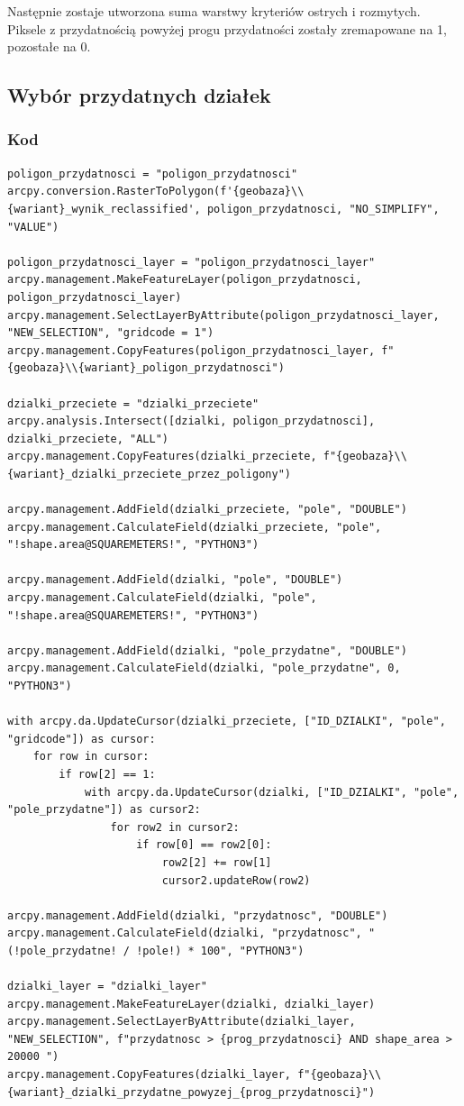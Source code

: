 \documentclass{article}
\begin{document}
Następnie zostaje utworzona suma warstwy kryteriów ostrych i rozmytych. Piksele z przydatnością powyżej progu przydatności zostały zremapowane na 1, pozostałe na 0.

\subsection{Wybór przydatnych działek}
\subsubsection{Kod}
\begin{lstlisting}
poligon_przydatnosci = "poligon_przydatnosci"
arcpy.conversion.RasterToPolygon(f'{geobaza}\\{wariant}_wynik_reclassified', poligon_przydatnosci, "NO_SIMPLIFY", "VALUE")

poligon_przydatnosci_layer = "poligon_przydatnosci_layer"
arcpy.management.MakeFeatureLayer(poligon_przydatnosci, poligon_przydatnosci_layer)
arcpy.management.SelectLayerByAttribute(poligon_przydatnosci_layer, "NEW_SELECTION", "gridcode = 1")
arcpy.management.CopyFeatures(poligon_przydatnosci_layer, f"{geobaza}\\{wariant}_poligon_przydatnosci")

dzialki_przeciete = "dzialki_przeciete"
arcpy.analysis.Intersect([dzialki, poligon_przydatnosci], dzialki_przeciete, "ALL")
arcpy.management.CopyFeatures(dzialki_przeciete, f"{geobaza}\\{wariant}_dzialki_przeciete_przez_poligony")

arcpy.management.AddField(dzialki_przeciete, "pole", "DOUBLE")
arcpy.management.CalculateField(dzialki_przeciete, "pole", "!shape.area@SQUAREMETERS!", "PYTHON3")

arcpy.management.AddField(dzialki, "pole", "DOUBLE")
arcpy.management.CalculateField(dzialki, "pole", "!shape.area@SQUAREMETERS!", "PYTHON3")

arcpy.management.AddField(dzialki, "pole_przydatne", "DOUBLE")
arcpy.management.CalculateField(dzialki, "pole_przydatne", 0, "PYTHON3")

with arcpy.da.UpdateCursor(dzialki_przeciete, ["ID_DZIALKI", "pole", "gridcode"]) as cursor:
    for row in cursor:
        if row[2] == 1:
            with arcpy.da.UpdateCursor(dzialki, ["ID_DZIALKI", "pole", "pole_przydatne"]) as cursor2:
                for row2 in cursor2:
                    if row[0] == row2[0]:
                        row2[2] += row[1]
                        cursor2.updateRow(row2)

arcpy.management.AddField(dzialki, "przydatnosc", "DOUBLE")
arcpy.management.CalculateField(dzialki, "przydatnosc", "(!pole_przydatne! / !pole!) * 100", "PYTHON3")

dzialki_layer = "dzialki_layer"
arcpy.management.MakeFeatureLayer(dzialki, dzialki_layer)
arcpy.management.SelectLayerByAttribute(dzialki_layer, "NEW_SELECTION", f"przydatnosc > {prog_przydatnosci} AND shape_area > 20000 ")
arcpy.management.CopyFeatures(dzialki_layer, f"{geobaza}\\{wariant}_dzialki_przydatne_powyzej_{prog_przydatnosci}")
\end{lstlisting}
\end{document}
